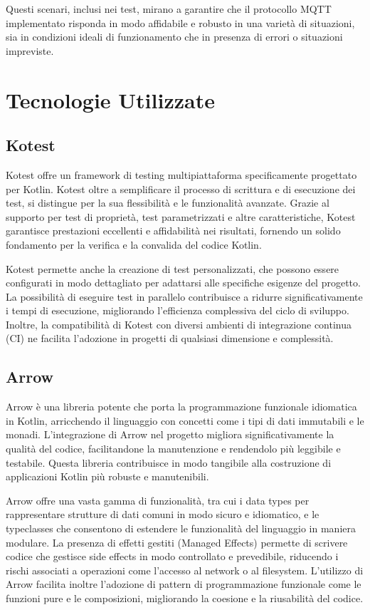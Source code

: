 \documentclass[12pt,a4paper,openright,twoside]{book}
\begin{document}
Questi scenari, inclusi nei test, mirano a garantire che il protocollo MQTT implementato risponda in modo affidabile e robusto in una varietà di situazioni, sia in condizioni 
ideali di funzionamento che in presenza di errori o situazioni impreviste.

\section{Tecnologie Utilizzate}

\subsection{Kotest}
Kotest offre un framework di testing multipiattaforma specificamente progettato per Kotlin. Kotest oltre a semplificare il processo di scrittura e di esecuzione dei test, 
si distingue per la sua flessibilità e le funzionalità avanzate. Grazie al supporto per test di proprietà, test parametrizzati e altre caratteristiche, Kotest garantisce prestazioni 
eccellenti e affidabilità nei risultati, fornendo un solido fondamento per la verifica e la convalida del codice Kotlin.

Kotest permette anche la creazione di test personalizzati, che possono essere configurati in modo dettagliato per adattarsi alle specifiche esigenze del progetto. 
La possibilità di eseguire test in parallelo contribuisce a ridurre significativamente i tempi di esecuzione, migliorando l'efficienza complessiva del ciclo di sviluppo. 
Inoltre, la compatibilità di Kotest con diversi ambienti di integrazione continua (CI) ne facilita l'adozione in progetti di qualsiasi dimensione e complessità.

\subsection{Arrow}
Arrow è una libreria potente che porta la programmazione funzionale idiomatica in Kotlin, arricchendo il linguaggio con concetti come i tipi di dati immutabili e le monadi. 
L'integrazione di Arrow nel progetto migliora significativamente la qualità del codice, facilitandone la manutenzione e rendendolo più leggibile e testabile. 
Questa libreria contribuisce in modo tangibile alla costruzione di applicazioni Kotlin più robuste e manutenibili.

Arrow offre una vasta gamma di funzionalità, tra cui i data types per rappresentare strutture di dati comuni in modo sicuro e idiomatico, e le typeclasses che consentono di estendere 
le funzionalità del linguaggio in maniera modulare. La presenza di effetti gestiti (Managed Effects) permette di scrivere codice che gestisce side effects in modo controllato e 
prevedibile, riducendo i rischi associati a operazioni come l'accesso al network o al filesystem. L'utilizzo di Arrow facilita inoltre l'adozione di pattern di programmazione 
funzionale come le funzioni pure e le composizioni, migliorando la coesione e la riusabilità del codice.
\end{document}
